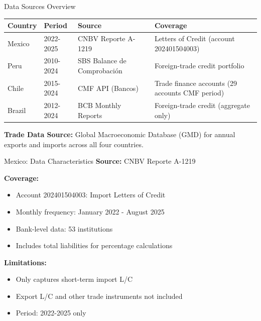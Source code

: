 \documentclass[aspectratio=169,11pt]{beamer}
\begin{document}
\begin{frame}{Data Sources Overview}
\begin{table}[h]
\centering
\small
\begin{tabular}{lllp{5cm}}
\toprule
\textbf{Country} & \textbf{Period} & \textbf{Source} & \textbf{Coverage} \\
\midrule
Mexico & 2022-2025 & CNBV Reporte A-1219 & Letters of Credit (account 202401504003) \\
Peru & 2010-2024 & SBS Balance de Comprobación & Foreign-trade credit portfolio \\
Chile & 2015-2024 & CMF API (Bancos) & Trade finance accounts (29 accounts CMF period) \\
Brazil & 2012-2024 & BCB Monthly Reports & Foreign-trade credit (aggregate only) \\
\bottomrule
\end{tabular}
\end{table}

\vspace{0.5cm}
\textbf{Trade Data Source:} Global Macroeconomic Database (GMD) for annual exports and imports across all four countries.
\end{frame}

\begin{frame}{Mexico: Data Characteristics}
\textbf{Source:} CNBV Reporte A-1219

\vspace{0.3cm}
\textbf{Coverage:}
\begin{itemize}
    \item Account 202401504003: Import Letters of Credit 
    \item Monthly frequency: January 2022 - August 2025
    \item Bank-level data: 53 institutions
    \item Includes total liabilities for percentage calculations
\end{itemize}

\vspace{0.3cm}
\textbf{Limitations:}
\begin{itemize}
    \item Only captures short-term import L/C
    \item Export L/C and other trade instruments not included
    \item Period: 2022-2025 only
\end{itemize}
\end{frame}
\end{document}
